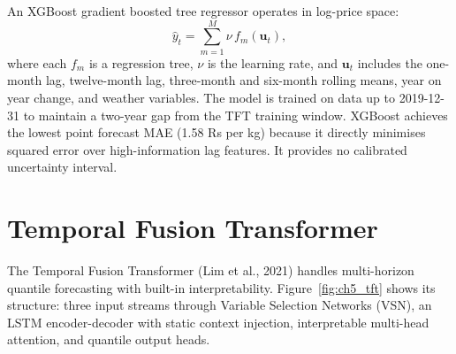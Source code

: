 \documentclass[12pt,a4paper]{report}
\begin{document}
An XGBoost gradient boosted tree regressor operates in log-price space:
\[
\hat{y}_t = \sum_{m=1}^{M} \nu\, f_m(\mathbf{u}_t),
\]
where each $f_m$ is a regression tree, $\nu$ is the learning rate, and $\mathbf{u}_t$
includes the one-month lag, twelve-month lag, three-month and six-month rolling means,
year on year change, and weather variables. The model is trained on data up to 2019-12-31
to maintain a two-year gap from the TFT training window. XGBoost achieves the lowest
point forecast MAE (1.58 Rs per kg) because it directly minimises squared error over
high-information lag features. It provides no calibrated uncertainty interval.

\section{Temporal Fusion Transformer}

The Temporal Fusion Transformer (Lim et al., 2021) handles multi-horizon quantile
forecasting with built-in interpretability. Figure~\ref{fig:ch5_tft} shows its structure:
three input streams through Variable Selection Networks (VSN), an LSTM encoder-decoder with
static context injection, interpretable multi-head attention, and quantile output heads.
\end{document}
